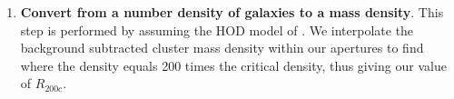 \begin{enumerate}
\item {\bf Convert from a number density of galaxies to a mass density}. This step is performed by assuming the HOD model of \cite{Tinker2011CosmologicalClusters}. 
We interpolate the background subtracted cluster mass density within our apertures to find where the density equals 200 times the critical density, thus giving our value of $R_{200c}$. 


\end{enumerate}
